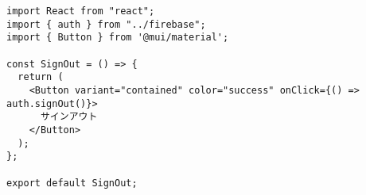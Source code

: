 \begin{verbatim}
import React from "react";
import { auth } from "../firebase";
import { Button } from '@mui/material';

const SignOut = () => {
  return (
    <Button variant="contained" color="success" onClick={() => auth.signOut()}>
      サインアウト
    </Button>
  );
};

export default SignOut;
\end{verbatim}